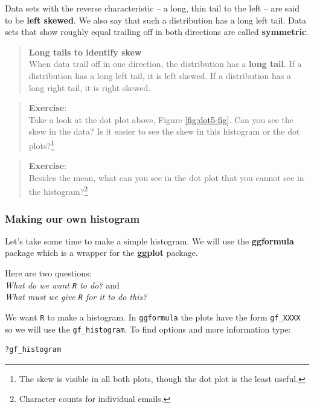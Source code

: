 \documentclass[
]{book}
\begin{document}
Data sets with the reverse characteristic -- a long, thin tail to the left -- are said to be \textbf{left skewed}. We also say that such a distribution has a long left tail. Data sets that show roughly equal trailing off in both directions are called \textbf{symmetric}.

\begin{quote}
\textbf{Long tails to identify skew}\\
When data trail off in one direction, the distribution has a \textbf{long tail}. If a distribution has a long left tail, it is left skewed. If a distribution has a long right tail, it is right skewed.
\end{quote}

\begin{quote}
\textbf{Exercise}:\\
Take a look at the dot plot above, Figure \ref{fig:dot5-fig}. Can you see the skew in the data? Is it easier to see the skew in this histogram or the dot plots?\footnote{The skew is visible in all both plots, though the dot plot is the least useful.}
\end{quote}

\begin{quote}
\textbf{Exercise}:\\
Besides the mean, what can you see in the dot plot that you cannot see in the histogram?\footnote{Character counts for individual emails.}
\end{quote}

\hypertarget{making-our-own-histogram}{%
\subsubsection{Making our own histogram}\label{making-our-own-histogram}}

Let's take some time to make a simple histogram. We will use the \textbf{ggformula} package which is a wrapper for the \textbf{ggplot} package.

Here are two questions:\\
\emph{What do we want \texttt{R} to do?} and\\
\emph{What must we give \texttt{R} for it to do this?}

We want \texttt{R} to make a histogram. In \texttt{ggformula} the plots have the form \texttt{gf\_XXXX} so we will use the \texttt{gf\_histogram}. To find options and more information type:

\begin{verbatim}
?gf_histogram
\end{verbatim}
\end{document}
